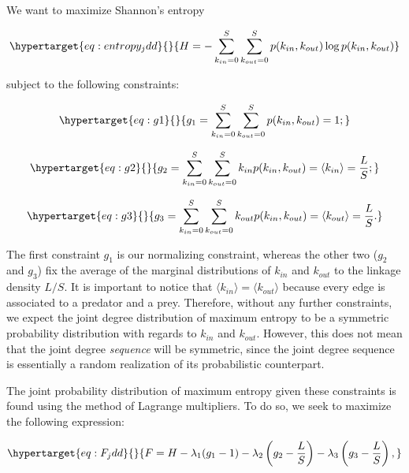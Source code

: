 \documentclass[11pt]{article}
\begin{document}
We want to maximize Shannon's entropy

\begin{equation}\protect\hypertarget{eq:entropy_jdd}{}{H = -\sum_{k_{in}=0}^S\sum_{k_{out}=0}^S p(k_{in},k_{out}) \log p(k_{in},k_{out})}\label{eq:entropy_jdd}\end{equation}

subject to the following constraints:

\begin{equation}\protect\hypertarget{eq:g1}{}{g_1 = \sum_{k_{in}=0}^S\sum_{k_{out}=0}^S p(k_{in},k_{out}) = 1;}\label{eq:g1}\end{equation}

\begin{equation}\protect\hypertarget{eq:g2}{}{g_2 = \sum_{k_{in}=0}^S\sum_{k_{out}=0}^S k_{in} p(k_{in},k_{out}) = \langle k_{in} \rangle = \frac{L}{S};}\label{eq:g2}\end{equation}

\begin{equation}\protect\hypertarget{eq:g3}{}{g_3 = \sum_{k_{in}=0}^S\sum_{k_{out}=0}^S k_{out} p(k_{in},k_{out}) = \langle k_{out} \rangle = \frac{L}{S}.}\label{eq:g3}\end{equation}

The first constraint \(g_1\) is our normalizing constraint, whereas the
other two (\(g_2\) and \(g_3\)) fix the average of the marginal
distributions of \(k_{in}\) and \(k_{out}\) to the linkage density
\(L/S\). It is important to notice that
\(\langle k_{in} \rangle = \langle k_{out} \rangle\) because every edge
is associated to a predator and a prey. Therefore, without any further
constraints, we expect the joint degree distribution of maximum entropy
to be a symmetric probability distribution with regards to \(k_{in}\)
and \(k_{out}\). However, this does not mean that the joint degree
\emph{sequence} will be symmetric, since the joint degree sequence is
essentially a random realization of its probabilistic counterpart.

The joint probability distribution of maximum entropy given these
constraints is found using the method of Lagrange multipliers. To do so,
we seek to maximize the following expression:

\begin{equation}\protect\hypertarget{eq:F_jdd}{}{F = H - \lambda_1(g_1-1)-\lambda_2\left( g_2-\frac{L}{S}\right) - \lambda_3 \left( g_3-\frac{L}{S}\right),}\label{eq:F_jdd}\end{equation}
\end{document}
